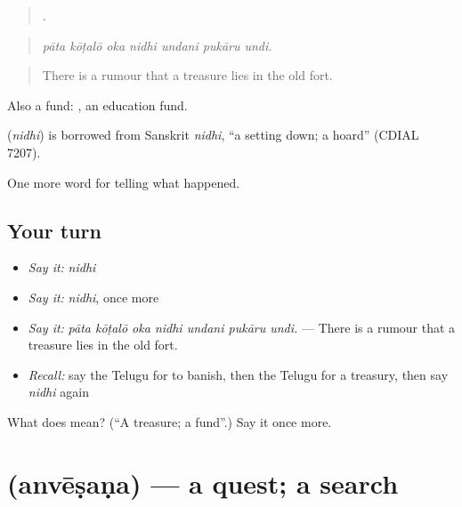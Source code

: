\begin{quote}
      .
\end{quote}

\begin{quote}
\emph{pāta kōṭalō oka nidhi undani pukāru undi.}
\end{quote}

\begin{quote}
There is a rumour that a treasure lies in the old fort.
\end{quote}

Also a fund:  , an education fund.

\begin{cousinweb}
\textbf{} (\emph{nidhi}) is borrowed from Sanskrit \emph{nidhi}, \textquotedblleft{}a setting down; a hoard\textquotedblright{} (CDIAL 7207).
\end{cousinweb}

\begin{grammarlens}[title={What you've built}]
One more word for telling what happened.
\end{grammarlens}

\subsection*{Your turn}
\begin{itemize}
\raggedright
  \item \emph{Say it:} \emph{nidhi}
  \item \emph{Say it:} \emph{nidhi}, once more
  \item \emph{Say it:} \emph{pāta kōṭalō oka nidhi undani pukāru undi.} — There is a rumour that a treasure lies in the old fort.
  \item \emph{Recall:} say the Telugu for to banish, then the Telugu for a treasury, then say \emph{nidhi} again
\end{itemize}

\begin{tcolorbox}[breakable,colback=teal!4,colframe=teal!35!black,title={Before you move on}]
What does  mean? (\textquotedblleft{}A treasure; a fund\textquotedblright{}.) Say it once more.
\end{tcolorbox}
\section[\texorpdfstring{\te{అన్వేషణ} (anvēṣaṇa)}{అన్వేషణ (anvēṣaṇa)}]{ (anvēṣaṇa) — a quest; a search}

